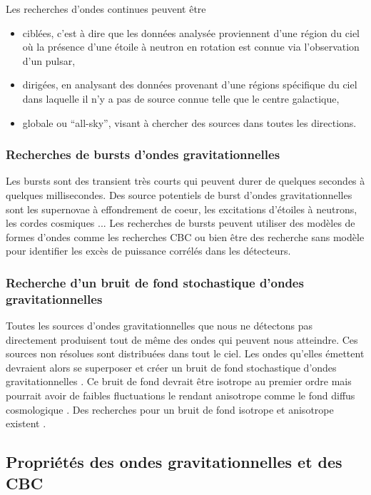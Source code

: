Les recherches d'ondes continues peuvent être
\begin{itemize}
\item ciblées, c'est à dire que les données analysée proviennent d'une région du ciel où la présence d'une étoile à neutron en rotation est connue via l'observation d'un pulsar,
\item dirigées, en analysant des données provenant d'une régions spécifique du ciel dans laquelle il n'y a pas de source connue telle que le centre galactique,
\item globale ou ``all-sky'', visant à chercher des sources dans toutes les directions.
\end{itemize}

\subsubsection*{Recherches de bursts d'ondes gravitationnelles}
Les bursts sont des transient très courts qui peuvent durer de quelques secondes à quelques millisecondes.
Des source potentiels de burst d'ondes gravitationnelles sont les supernovae à effondrement de coeur, les excitations d'étoiles à neutrons, les cordes cosmiques \cite{LVK_burst}...
Les recherches de bursts peuvent utiliser des modèles de formes d'ondes comme les recherches CBC ou bien être des recherche sans modèle pour identifier les excès de puissance corrélés dans les détecteurs.

\subsubsection*{Recherche d'un bruit de fond stochastique d'ondes gravitationnelles}
Toutes les sources d'ondes gravitationnelles que nous ne détectons pas directement produisent tout de même des ondes qui peuvent nous atteindre.
Ces sources non résolues sont distribuées dans tout le ciel.
Les ondes qu'elles émettent devraient alors se superposer et créer un bruit de fond stochastique d'ondes gravitationnelles \cite{stochastic}.
Ce bruit de fond devrait être isotrope au premier ordre mais pourrait avoir de faibles fluctuations le rendant anisotrope comme le fond diffus cosmologique \cite{cmb}.
Des recherches pour un bruit de fond isotrope et anisotrope existent \cite{LVK_stochastic_aniso,LVK_stochastic_iso}.

\subsection{Propriétés des ondes gravitationnelles et des CBC}

